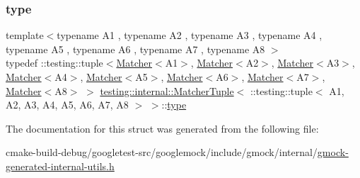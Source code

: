 \subsubsection{\texorpdfstring{type}{type}}
{\footnotesize\ttfamily template$<$typename A1 , typename A2 , typename A3 , typename A4 , typename A5 , typename A6 , typename A7 , typename A8 $>$ \\
typedef \+::testing\+::tuple$<$\mbox{\hyperlink{classtesting_1_1Matcher}{Matcher}}$<$A1$>$, \mbox{\hyperlink{classtesting_1_1Matcher}{Matcher}}$<$A2$>$, \mbox{\hyperlink{classtesting_1_1Matcher}{Matcher}}$<$A3$>$, \mbox{\hyperlink{classtesting_1_1Matcher}{Matcher}}$<$A4$>$, \mbox{\hyperlink{classtesting_1_1Matcher}{Matcher}}$<$A5$>$, \mbox{\hyperlink{classtesting_1_1Matcher}{Matcher}}$<$A6$>$, \mbox{\hyperlink{classtesting_1_1Matcher}{Matcher}}$<$A7$>$, \mbox{\hyperlink{classtesting_1_1Matcher}{Matcher}}$<$A8$>$ $>$ \mbox{\hyperlink{structtesting_1_1internal_1_1MatcherTuple}{testing\+::internal\+::\+Matcher\+Tuple}}$<$ \+::testing\+::tuple$<$ A1, A2, A3, A4, A5, A6, A7, A8 $>$ $>$\+::\mbox{\hyperlink{structtesting_1_1internal_1_1MatcherTuple_3_01_1_1testing_1_1tuple_3_01A1_00_01A2_00_01A3_00_01Aed2bba98e2ef5f11a8df3506707ec6d8_a17186b5ae808ec16b84eb4022ab7a089}{type}}}



The documentation for this struct was generated from the following file\+:\begin{DoxyCompactItemize}
\item 
cmake-\/build-\/debug/googletest-\/src/googlemock/include/gmock/internal/\mbox{\hyperlink{gmock-generated-internal-utils_8h}{gmock-\/generated-\/internal-\/utils.\+h}}\end{DoxyCompactItemize}

